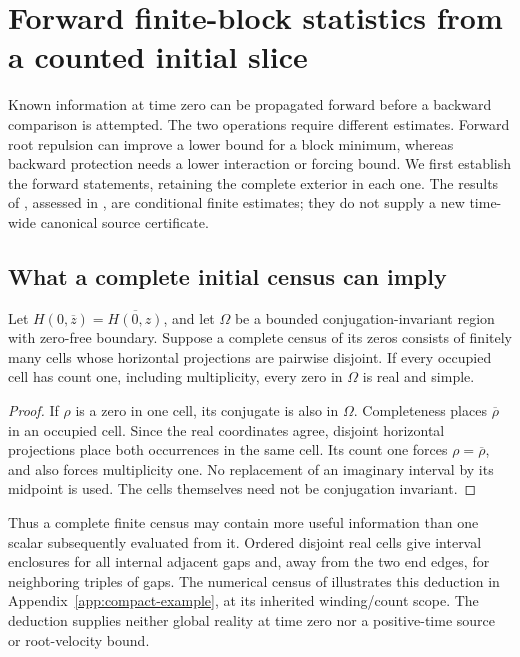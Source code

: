 \section{Forward finite-block statistics from a counted initial slice}
\label{sec:forward-statistics}

Known information at time zero can be propagated forward before a
backward comparison is attempted. The two operations require different
estimates. Forward root repulsion can improve a lower bound for a block
minimum, whereas backward protection needs a lower interaction or forcing
bound. We first establish the forward statements, retaining the complete
exterior in each one. The results of \cite{BakerCM32,BakerCM34}, assessed
in \cite{BakerCMReview29,BakerCMReview30}, are conditional finite estimates;
they do not supply a new time-wide canonical source certificate.

\subsection{What a complete initial census can imply}

\begin{lemma}
\label{fwd:singleton}
Let $H(0,\overline z)=\overline{H(0,z)}$, and let $\Omega$ be a bounded
conjugation-invariant region with zero-free boundary. Suppose a complete
census of its zeros consists of finitely many cells whose horizontal
projections are pairwise disjoint. If every occupied cell has count one,
including multiplicity, every zero in $\Omega$ is real and simple.
\end{lemma}
\begin{proof}
If $\rho$ is a zero in one cell, its conjugate is also in $\Omega$.
Completeness places $\overline\rho$ in an occupied cell. Since the real
coordinates agree, disjoint horizontal projections place both occurrences
in the same cell. Its count one forces $\rho=\overline\rho$, and also
forces multiplicity one. No replacement of an imaginary interval by its
midpoint is used. The cells themselves need not be conjugation invariant.
\end{proof}

Thus a complete finite census may contain more useful information than
one scalar subsequently evaluated from it. Ordered disjoint real cells
give interval enclosures for all internal adjacent gaps and, away from the
two end edges, for neighboring triples of gaps. The numerical census of
\cite{BakerOCCensus22} illustrates this deduction in
Appendix~\ref{app:compact-example}, at its inherited winding/count scope.
The deduction supplies neither global reality at time zero nor a
positive-time source or root-velocity bound.


